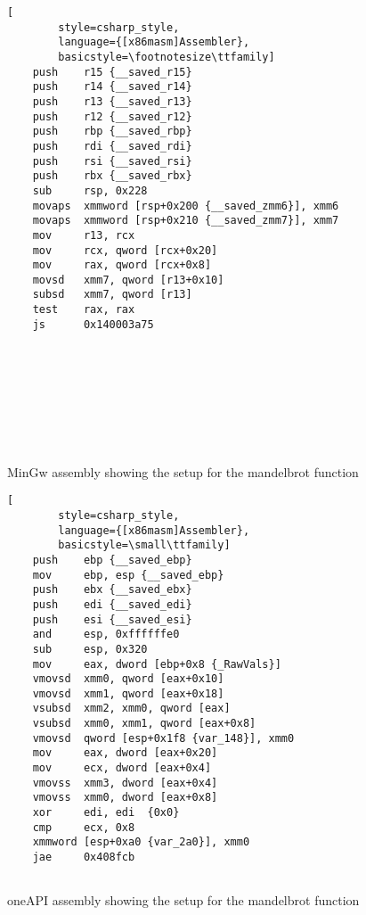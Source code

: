 \begin{figure}[ht]
    \begin{minipage}[b]{0.5\linewidth}
    \begin{lstlisting}[
        style=csharp_style,
        language={[x86masm]Assembler},
        basicstyle=\footnotesize\ttfamily]
    push    r15 {__saved_r15}
    push    r14 {__saved_r14}
    push    r13 {__saved_r13}
    push    r12 {__saved_r12}
    push    rbp {__saved_rbp}
    push    rdi {__saved_rdi}
    push    rsi {__saved_rsi}
    push    rbx {__saved_rbx}
    sub     rsp, 0x228
    movaps  xmmword [rsp+0x200 {__saved_zmm6}], xmm6
    movaps  xmmword [rsp+0x210 {__saved_zmm7}], xmm7
    mov     r13, rcx
    mov     rcx, qword [rcx+0x20]
    mov     rax, qword [rcx+0x8]
    movsd   xmm7, qword [r13+0x10]
    subsd   xmm7, qword [r13]
    test    rax, rax
    js      0x140003a75
        




    

    
    \end{lstlisting}
    \caption{MinGw assembly showing the setup for the mandelbrot function}
    \label{fig:assembly1}
    \end{minipage}
    \hspace{0.5cm}
    \begin{minipage}[b]{0.5\linewidth}
    \begin{lstlisting}[
        style=csharp_style,
        language={[x86masm]Assembler},
        basicstyle=\small\ttfamily]
    push    ebp {__saved_ebp}
    mov     ebp, esp {__saved_ebp}
    push    ebx {__saved_ebx}
    push    edi {__saved_edi}
    push    esi {__saved_esi}
    and     esp, 0xffffffe0
    sub     esp, 0x320
    mov     eax, dword [ebp+0x8 {_RawVals}]
    vmovsd  xmm0, qword [eax+0x10]
    vmovsd  xmm1, qword [eax+0x18]
    vsubsd  xmm2, xmm0, qword [eax]
    vsubsd  xmm0, xmm1, qword [eax+0x8]
    vmovsd  qword [esp+0x1f8 {var_148}], xmm0
    mov     eax, dword [eax+0x20]
    mov     ecx, dword [eax+0x4]
    vmovss  xmm3, dword [eax+0x4]
    vmovss  xmm0, dword [eax+0x8]
    xor     edi, edi  {0x0}
    cmp     ecx, 0x8
    xmmword [esp+0xa0 {var_2a0}], xmm0
    jae     0x408fcb
        
    \end{lstlisting}
    \caption{oneAPI assembly showing the setup for the mandelbrot function}
    \label{fig:assembly2}
    \end{minipage}
\end{figure}

